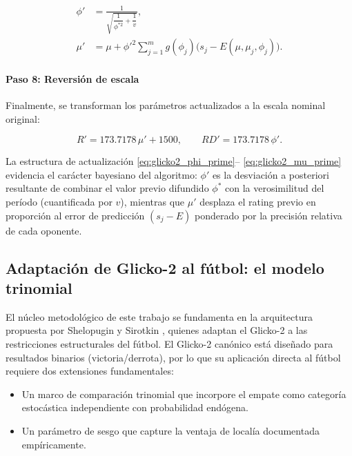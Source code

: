 \begin{definition}
	\begin{align}
		\phi' &=\frac{1}{\sqrt{\dfrac{1}{\phi^{*2}}+\dfrac{1}{v}}},
		\label{eq:glicko2_phi_prime}\\[6pt]
		\mu' &=\mu+\phi'^{2}\sum_{j=1}^{m}g(\phi_j)
		\bigl(s_j-E(\mu,\mu_j,\phi_j)\bigr).
		\label{eq:glicko2_mu_prime}
	\end{align}
	
	\paragraph*{Paso 8: Reversi\'on de escala} Finalmente, se transforman los par\'ametros actualizados a la escala nominal original:
	
	\begin{equation}\label{eq:glicko2_revert}
		R'=173{.}7178\,\mu'+1500,\qquad RD'=173{.}7178\,\phi'.
	\end{equation}
\end{definition}

\begin{obs}
	La estructura de actualizaci\'on \eqref{eq:glicko2_phi_prime}--	\eqref{eq:glicko2_mu_prime} evidencia el car\'acter bayesiano del algoritmo: $\phi'$ es la desviaci\'on a posteriori resultante de combinar el valor previo difundido $\phi^{*}$ con la verosimilitud del per\'iodo (cuantificada por $v$), mientras que $\mu'$ desplaza el rating previo en proporci\'on al error de predicci\'on $(s_j-E)$ ponderado por la precisi\'on relativa de cada oponente.
\end{obs}

\subsection{Adaptaci\'on de Glicko-2 al f\'utbol: el modelo trinomial}
\label{subsec:shelopugin}

El n\'ucleo metodol\'ogico de este trabajo se fundamenta en la arquitectura propuesta por Shelopugin y Sirotkin \cite{Glicko2Mod}, quienes adaptan el Glicko-2 a las restricciones estructurales del f\'utbol. El Glicko-2 can\'onico est\'a dise\~nado para resultados binarios (victoria/derrota), por lo que su aplicaci\'on directa al f\'utbol requiere dos extensiones fundamentales: 

\begin{itemize}
	\item Un marco de comparaci\'on trinomial que incorpore el empate como categor\'ia estoc\'astica independiente con probabilidad end\'ogena.
	\item Un par\'ametro de sesgo que capture la ventaja de local\'ia documentada emp\'iricamente.
\end{itemize}


